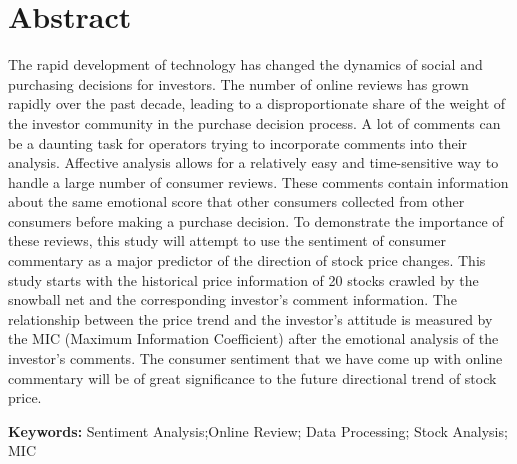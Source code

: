 \section*{ \textbf{Abstract}}
\noindent
The rapid development of technology has changed the dynamics of social and purchasing decisions for investors. The number of online reviews has grown rapidly over the past decade, leading to a disproportionate share of the weight of the investor community in the purchase decision process. A lot of comments can be a daunting task for operators trying to incorporate comments into their analysis. Affective analysis allows for a relatively easy and time-sensitive way to handle a large number of consumer reviews. These comments contain information about the same emotional score that other consumers collected from other consumers before making a purchase decision. To demonstrate the importance of these reviews, this study will attempt to use the sentiment of consumer commentary as a major predictor of the direction of stock price changes. This study starts with the historical price information of 20 stocks crawled by the snowball net and the corresponding investor's comment information. The relationship between the price trend and the investor's attitude is measured by the MIC (Maximum Information Coefficient) after the emotional analysis of the investor's comments. The consumer sentiment that we have come up with online commentary will be of great significance to the future directional trend of stock price.

\vspace{0.5cm}
\noindent
\textbf{Keywords: }Sentiment Analysis;Online Review; Data Processing; Stock Analysis; MIC
